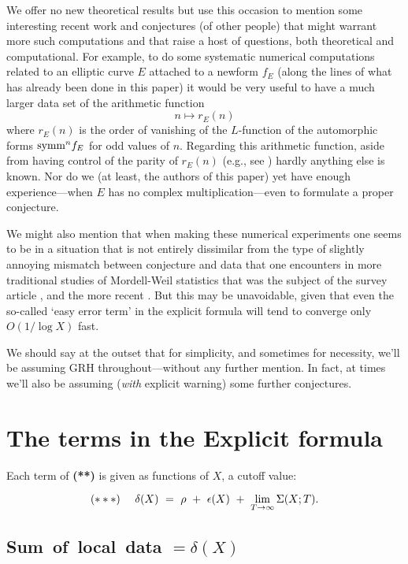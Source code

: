 \documentclass[11pt]{article}
\theoremstyle{plain}
\theoremstyle{definition}
\numberwithin{equation}{section}
\numberwithin{figure}{section}
\numberwithin{table}{section}
\begin{document}
 We offer no new theoretical results but use this occasion to mention some interesting recent work and conjectures  (of other people)  that might warrant more such computations and that raise a host of questions, both theoretical and computational.   For example, to do some systematic numerical computations related to an elliptic curve $E$ attached to a newform $f_E$  (along the lines of what has already been done in this paper)  it would be very useful to have a much larger data set  of the arithmetic function  $$n \mapsto r_E(n)$$
 where $r_E(n)$ is the order of vanishing of the $L$-function of the automorphic forms ${\rm symm}^n f_E$ for odd values of $n$.  Regarding this arithmetic function, aside from having control of the parity of   $r_E(n)$  (e.g., see \cite{DMW})  hardly anything else is known. Nor do we (at least, the authors of this paper)  yet have enough experience---when $E$ has no complex multiplication---even to formulate a proper conjecture.

 We might also mention that when making these numerical experiments one seems to be in a situation  that is not entirely dissimilar from the type of slightly annoying mismatch between conjecture and data that one encounters in more traditional studies of Mordell-Weil statistics  that was the subject of the survey article \cite{bmsw:bulletins}, and the more recent \cite{ecdb:height}.  But this may be unavoidable, given that even  the so-called  `easy error term' in the explicit formula will tend to converge  only $O(1/\log X)$ fast.

 We should say at the outset that for simplicity, and sometimes for necessity, we'll be assuming GRH throughout---without any further mention. In fact, at times we'll also be assuming ({\it with} explicit warning) some further conjectures.

\hskip20pt{\small{\tableofcontents}}
 \section{The terms in the Explicit formula}



   Each  term of {\bf (**)}  is given as functions of $X$, a cutoff value:


$${\bf(***)}\ \ \ \  \delta(X)   \ = \   \rho \ +\ \epsilon(X) \ +\  \lim_{T\to \infty}\Sigma(X; T).$$


 \subsection{ Sum\ of\ local\ data $= \delta(X)  $}
\end{document}
